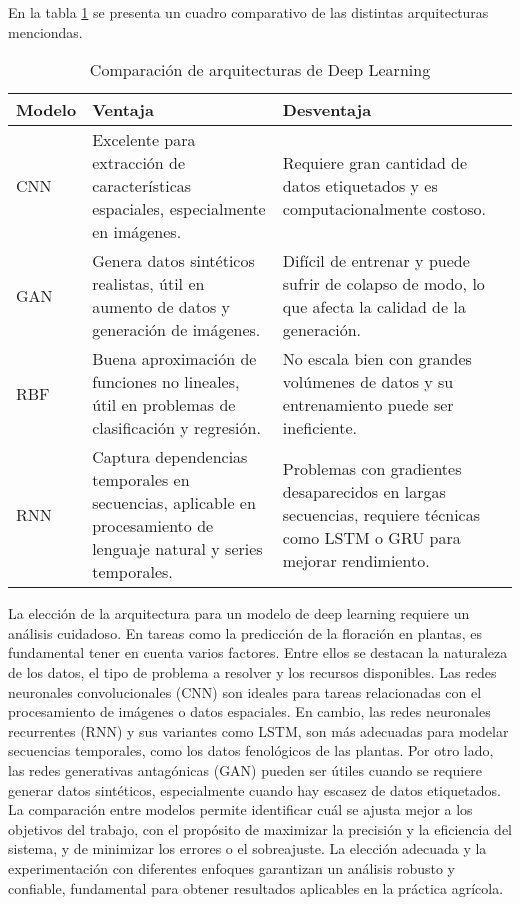 En la tabla \ref{tab:redes_dl} se presenta un cuadro comparativo de las distintas arquitecturas menciondas.

\begin{table}[ht]
    \centering
    \caption{Comparación de arquitecturas de Deep Learning}
    \renewcommand{\arraystretch}{1} %
    \begin{tabular}{|>{\raggedright}m{2cm}|m{5cm}|m{5cm}|} %
        \hline
        \textbf{\large Modelo} & \textbf{\large Ventaja} & \textbf{\large Desventaja} \\
        \hline
        \large CNN & \large Excelente para extracción de características espaciales, especialmente en imágenes. 
		& \large Requiere gran cantidad de datos etiquetados y es computacionalmente costoso. \\
        \hline
        \large GAN & \large Genera datos sintéticos realistas, útil en aumento de datos y generación de imágenes. 
		& \large Difícil de entrenar y puede sufrir de colapso de modo, lo que afecta la calidad de la generación. \\
        \hline
        \large RBF & \large Buena aproximación de funciones no lineales, útil en problemas de clasificación y regresión.
		 & \large No escala bien con grandes volúmenes de datos y su entrenamiento puede ser ineficiente. \\
        \hline
        \large RNN & \large Captura dependencias temporales en secuencias, aplicable en procesamiento de lenguaje natural 
		y series temporales. & \large Problemas con gradientes desaparecidos en largas secuencias, requiere técnicas como 
		LSTM o GRU para mejorar rendimiento.\\
        \hline
    \end{tabular}
    \label{tab:redes_dl}
\end{table}


	La elección de la arquitectura para un modelo de deep learning requiere un análisis cuidadoso. En tareas como la predicción 
	de la floración en plantas, es fundamental tener en cuenta varios factores. Entre ellos se destacan la naturaleza de los datos, 
	el tipo de problema a resolver y los recursos disponibles. Las redes neuronales convolucionales (CNN) son 
	ideales para tareas relacionadas con el procesamiento de imágenes o datos espaciales. En cambio, 
  	las redes neuronales recurrentes (RNN) y sus variantes como LSTM, son más adecuadas para modelar 
  	secuencias temporales, como los datos fenológicos de las plantas. Por otro lado, las redes generativas
   	antagónicas (GAN) pueden ser útiles cuando se requiere generar datos sintéticos, especialmente 
   	cuando hay escasez de datos etiquetados. La comparación entre modelos permite identificar cuál se ajusta mejor a los objetivos del 
	trabajo, con el propósito de maximizar la precisión y la eficiencia del sistema, y de minimizar los errores o el sobreajuste. La elección adecuada y la experimentación con diferentes
	enfoques garantizan un análisis robusto y confiable, fundamental para obtener resultados
	aplicables en la práctica agrícola.

